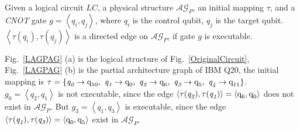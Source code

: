 \documentclass[runningheads]{llncs}
\begin{document}
Given a logical circuit $LC$, a physical structure $\mathcal{AG}_{P}$, an initial mapping $\tau$, and a \textit{CNOT} gate $g=\left \langle \textit{q}_\textit{i},\textit{q}_\textit{j}\right \rangle $, where $\textit{q}_\textit{i}$ is the control qubit, $\textit{q}_\textit{j}$ is the target qubit.
$\left \langle\tau(\textit{q}_\textit{i}),\tau(\textit{q}_\textit{j})\right \rangle $ 
is a directed edge on $\mathcal{AG}_{P}$, if gate $g$ is executable.

\begin{example}
	Fig.~\ref{LAGPAG} (a) is the logical structure of Fig.~\ref{OriginalCircuit}, 
	Fig.~\ref{LAGPAG} (b) is the partial architecture graph of IBM Q20, the initial mapping is 
	$\tau=\{\textit{q}_\textit{0}\rightarrow  \textup{q}_{\textup{10}},\ \textit{q}_\textit{1}\rightarrow \textup{q}_{\textup{0}},\ 
	\textit{q}_\textit{2}\rightarrow  \textup{q}_{\textup{6}},\ \textit{q}_\textit{3}\rightarrow  \textup{q}_{\textup{5}},\ \textit{q}_\textit{4}\rightarrow  \textup{q}_{\textup{11}}\}$.
	$g_{0}=\left \langle \textit{q}_\textit{2},\textit{q}_\textit{1}\right \rangle $ is not executable, since the edge $\left \langle \tau(\textit{q}_\textit{2}),\tau(\textit{q}_\textit{1})\right \rangle =\left \langle \textup{q}_{\textup{6}},\textup{q}_{\textup{0}}\right \rangle $ does not exist in $\mathcal{AG}_{P}$.
	But $g_{3}=\left \langle \textit{q}_\textit{1},\textit{q}_\textit{3}\right \rangle $ is executable, since 
	the edge $\left \langle \tau(\textit{q}_\textit{1}),\tau(\textit{q}_\textit{3})\right \rangle =\left \langle \textup{q}_{\textup{0}},\textup{q}_{\textup{5}}\right \rangle $  exist in $\mathcal{AG}_{P}$.
\end{example}
\end{document}
